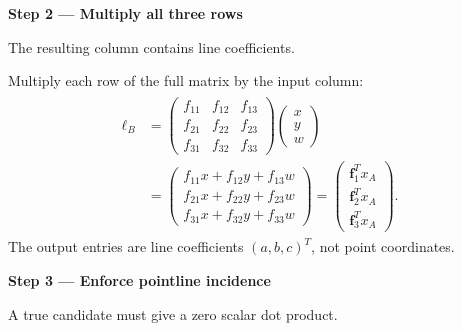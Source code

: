 \documentclass[letterpaper,11pt,english,openany,oneside]{jupyterBook}
\begin{document}
\par

\par\medskip{}
{\color{QuizStepRed}\bfseries Step 2 — Multiply all three rows}\par\smallskip

\sphinxAtStartPar
{} The resulting column contains line coefficients.

\sphinxAtStartPar
Multiply each row of the full matrix by the input column:
{\color{QuizMathBlue} \begin{equation*}
\begin{split}
\begin{aligned}
\ell_B&=\begin{pmatrix}f_{11}&f_{12}&f_{13}\\f_{21}&f_{22}&f_{23}\\f_{31}&f_{32}&f_{33}\end{pmatrix}
\begin{pmatrix}x\\y\\w\end{pmatrix}\\
&=\begin{pmatrix}f_{11}x+f_{12}y+f_{13}w\\f_{21}x+f_{22}y+f_{23}w\\f_{31}x+f_{32}y+f_{33}w\end{pmatrix}
=\begin{pmatrix}\mathbf f_1^Tx_A\\\mathbf f_2^Tx_A\\\mathbf f_3^Tx_A\end{pmatrix}.
\end{aligned}
\end{split}
\end{equation*}}
\sphinxAtStartPar
The output entries are line coefficients {\color{QuizMathBlue} \((a,b,c)^T\)}, not point coordinates.

\par

\par\medskip{}
{\color{QuizStepRed}\bfseries Step 3 — Enforce point\sphinxhyphen{}line incidence}\par\smallskip

\sphinxAtStartPar
{} A true candidate must give a zero scalar dot product.
\end{document}
